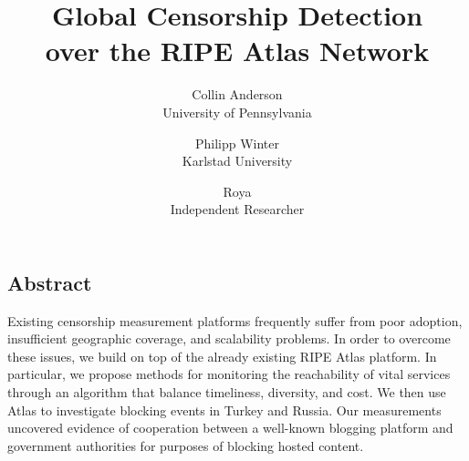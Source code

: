 \documentclass[letterpaper,twocolumn,10pt]{article}
\begin{document}
\date{}

\title{
	\Large \bf Global Censorship Detection \\
	over the RIPE Atlas Network
}

\author{
	{\rm Collin Anderson} \\
	University of Pennsylvania
	\and
	{\rm Philipp Winter} \\
	Karlstad University
	\and
	{\rm Roya} \\
	Independent Researcher
}

\maketitle

\thispagestyle{empty}

\subsection*{Abstract}

Existing censorship measurement platforms frequently suffer from poor adoption,
insufficient geographic coverage, and scalability problems.  In order to
overcome these issues, we build on top of the already existing RIPE Atlas
platform.  In particular, we propose methods for monitoring the reachability of
vital services through an algorithm that balance timeliness, diversity, and
cost.  We then use Atlas to investigate blocking events in Turkey and Russia.
Our measurements uncovered evidence of cooperation between a well-known
blogging platform and government authorities for purposes of blocking hosted
content.






% 



%



% 

\raggedright
\printbibliography

\end{document}
